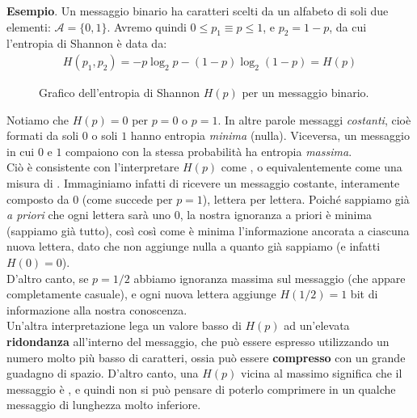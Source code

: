 \documentclass[../../InformazioneQuantistica.tex]{subfiles}
\begin{document}
\textbf{Esempio}. Un messaggio binario ha caratteri scelti da un alfabeto di soli due elementi: $\mathcal{A}=\{0,1\}$. Avremo quindi $0 \leq p_1 \equiv p \leq 1$, e $p_2 = 1-p$, da cui l'entropia di Shannon è data da:
\begin{align}
H(p_1, p_2) = -p \log_2 p - (1-p)\log_2(1-p) = H(p)
\label{eqn:mistura-classica}
\end{align}

\begin{figure}[H]
\centering

\caption{Grafico dell'entropia di Shannon $H(p)$ per un messaggio binario.\label{plot:shannon-binario}}
\end{figure}

Notiamo che $H(p)=0$ per $p=0$ o $p=1$. In altre parole messaggi \textit{costanti}, cioè formati da soli $0$ o soli $1$ hanno entropia \textit{minima} (nulla). Viceversa, un messaggio in cui $0$ e $1$ compaiono con la stessa probabilità ha entropia \textit{massima}.\\
Ciò è consistente con l'interpretare $H(p)$ come , o equivalentemente come una misura di . Immaginiamo infatti di ricevere un messaggio costante, interamente composto da $0$ (come succede per $p=1$), lettera per lettera. Poiché sappiamo già \textit{a priori} che ogni lettera sarà uno $0$, la nostra ignoranza a priori è minima (sappiamo già tutto), così così come è minima l'informazione ancorata a ciascuna nuova lettera, dato che non aggiunge nulla a quanto già sappiamo (e infatti $H(0)=0$).\\
D'altro canto, se $p=1/2$ abbiamo ignoranza massima sul messaggio (che appare completamente casuale), e ogni nuova lettera aggiunge $H(1/2)=1$ bit di informazione  alla nostra conoscenza.\\
Un'altra interpretazione lega un valore basso di $H(p)$ ad un'elevata \textbf{ridondanza} all'interno del messaggio, che può essere espresso utilizzando un numero molto più basso di caratteri, ossia può essere \textbf{compresso} con un grande guadagno di spazio. D'altro canto, una $H(p)$ vicina al massimo significa che il messaggio è , e quindi non si può pensare di poterlo comprimere in un qualche messaggio di lunghezza molto inferiore.
\end{document}
